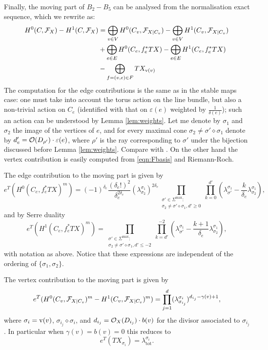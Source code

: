 Finally, the moving part of $B_2-B_5$ can be analysed from the normalisation exact sequence, which we rewrite as:
\begin{equation}\label{eqn:contrtoF}
\begin{aligned}
 H^0(C,\mathcal F_X)-H^1(C,\mathcal F_X) &= \bigoplus_{v\in V}H^0(C_v,\mathcal F_{X|C_v})-\bigoplus_{v\in V}H^1(C_v,\mathcal F_{X|C_v}) \\
 & + \bigoplus_{e\in E}H^0(C_e,f_e^*TX)-\bigoplus_{e\in E}H^1(C_e,f_e^*TX) \\
 & - \bigoplus_{f=(v,e)\in F} TX_{\operatorname{v}(v)}
\end{aligned} 
\end{equation}
The computation for the edge contributions is the same as in the stable maps case: one must take into account the torus action on the line bundle, but also a non-trivial action on $C_e$ (identified with that on $\varepsilon(e)$ weighted by $\frac{1}{\delta(e)}$); such an action can be understood by Lemma \ref{lem:weights}. Let me denote by $\sigma_1$ and $\sigma_2$ the image of the vertices of $e$, and for every maximal cone $\sigma_2\neq\sigma'\diamond\sigma_1$ denote by $d'_e=\mathcal{O}(D_{\rho'})\cdot \varepsilon(e)$, where $\rho'$ is the ray corresponding to $\sigma'$ under the bijection discussed before Lemma \ref{lem:weights}. Compare with \cite[Lemma 7.4 and Corollary 7.5]{HolgerSpielberg}. On the other hand the vertex contribution is easily computed from \eqref{eqn:Fbasis} and Riemann-Roch.
\begin{lem}
The edge contribution to the moving part is given by
\[
 e^T(H^0(C_e,f_e^*TX)^m)=(-1)^{\delta_e}\frac{(\delta_e!)^2}{\delta_e^{2\delta_e}}(\lambda^{\sigma_1}_{\sigma_2})^{2\delta_e}\prod_{\substack{\sigma'\in\Sigma^{\text{max}}: \\ \sigma_2\neq\sigma'\diamond\sigma_1,d'\geq0}}\prod_{k=0}^{d'}(\lambda^{\sigma_1}_{\sigma'}-\frac{k}{\delta_e}\lambda^{\sigma_1}_{\sigma_2}),
\]
and by Serre duality
\[
 e^T(H^1(C_e,f_e^*TX)^m)=\prod_{\substack{\sigma'\in\Sigma^{\text{max}}: \\ \sigma_2\neq\sigma'\diamond\sigma_1,d'\leq -2}}\prod_{k=d'}^{-2}(\lambda^{\sigma_1}_{\sigma'}-\frac{k+1}{\delta_e}\lambda^{\sigma_1}_{\sigma_2}),
\]
with notation as above. Notice that these expressions are independent of the ordering of $\{\sigma_1,\sigma_2\}$.
\end{lem}

\begin{lem}
 The vertex contribution to the moving part is given by
 \[
  e^T(H^0(C_v,\mathcal F_{X|C_v})^m-H^1(C_v,\mathcal F_{X|C_v})^m)=\prod_{j=1}^d(\lambda^{\sigma_i}_{\sigma_{i_j}})^{d_{i_j}-\gamma(v)+1},
 \]
\noindent where $\sigma_i=\operatorname{v}(v)$, $\sigma_{i_j}\diamond\sigma_i$, and $d_{i_j}=\mathcal{O}_X(D_{i_j})\cdot b(v)$ for the divisor associated to $\sigma_{i_j}$. In particular when $\gamma(v)=b(v)=0$ this reduces to
\[
 e^T(TX_{\sigma_i})=\lambda^{\sigma_i}_{\text{tot}}.
\]

\end{lem}

